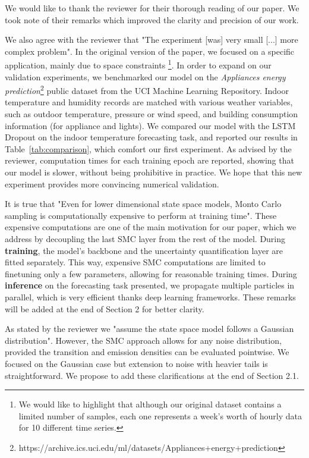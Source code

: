 \documentclass{article}
\begin{document}
We would like to thank the reviewer for their thorough reading of our paper.
We took note of their remarks which improved the clarity and precision of our work.

We also agree with the reviewer that "The experiment [was] very small [...] more complex problem".
In the original version of the paper, we focused on a specific application, mainly due to space constraints \footnote{We would like to highlight that although our original dataset contains a limited number of samples, each one represents a week's worth of hourly data for 10 different time series.}.
In order to expand on our validation experiments, we benchmarked our model on the \textit{Appliances energy prediction}\footnote{https://archive.ics.uci.edu/ml/datasets/Appliances+energy+prediction} public dataset from the UCI Machine Learning Repository.
Indoor temperature and humidity records are matched with various weather variables, such as outdoor temperature, pressure or wind speed, and building consumption information (for appliance and lights).
We compared our model with the LSTM Dropout on the indoor temperature forecasting task, and reported our results in Table~\ref{tab:comparison}, which comfort our first experiment.
As advised by the reviewer, computation times for each training epoch are reported, showing that our model is slower, without being prohibitive in practice.
We hope that this new experiment provides more convincing numerical validation.

It is true that "Even for lower dimensional state space models, Monto Carlo sampling is computationally expensive to perform at training time".
These expensive computations are one of the main motivation for our paper, which we address by decoupling the last SMC layer from the rest of the model.
During \textbf{training}, the model's backbone and the uncertainty quantification layer are fitted separately.
This way, expensive SMC computations are limited to finetuning only a few parameters, allowing for reasonable training times.
During {\bf inference} on the forecasting task presented, we propagate multiple particles in parallel, which is very efficient thanks deep learning frameworks.
These remarks will be added at the end of Section 2 for better clarity.

As stated by the reviewer we "assume the state space model follows a Gaussian distribution".
However, the SMC approach allows for any noise distribution, provided the transition and emission densities can be evaluated pointwise.
We focused on the Gaussian case but extension to noise with heavier tails is straightforward.
We propose to add these clarifications at the end of Section 2.1.
\end{document}
